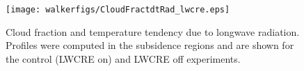 \documentclass[draft]{agujournal2019}
\begin{document}

\begin{figure}
  \centering
      \texttt{[image: walkerfigs/CloudFractdtRad\_lwcre.eps]}
  \caption{Cloud fraction and temperature tendency due to longwave radiation.  Profiles were computed in the 
  subsidence regions and are shown for the control (LWCRE on) and LWCRE off experiments.}
  \label{fig:cf_tdtlw}
\end{figure}
\end{document}
